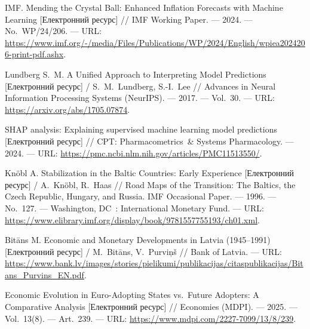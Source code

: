 \documentclass[a4paper,ukrainian,oneside]{extreport}
\begin{document}
\begin{enumerate}[label={[\arabic*]}, leftmargin=0pt, itemindent=0pt, labelindent=0pt]
\item IMF. Mending the Crystal Ball: Enhanced Inflation Forecasts with Machine Learning [Електронний ресурс] // IMF Working Paper. --- 2024. --- No.~WP/24/206. --- URL: \url{https://www.imf.org/-/media/Files/Publications/WP/2024/English/wpiea2024206-print-pdf.ashx}.

\item Lundberg S.~M. A Unified Approach to Interpreting Model Predictions [Електронний ресурс] / S.~M.~Lundberg, S.-I.~Lee // Advances in Neural Information Processing Systems (NeurIPS). --- 2017. --- Vol.~30. --- URL: \url{https://arxiv.org/abs/1705.07874}.

\item SHAP analysis: Explaining supervised machine learning model predictions [Електронний ресурс] // CPT: Pharmacometrics~\& Systems Pharmacology. --- 2024. --- URL: \url{https://pmc.ncbi.nlm.nih.gov/articles/PMC11513550/}.

\item Kn\"obl A. Stabilization in the Baltic Countries: Early Experience [Електронний ресурс] / A.~Kn\"obl, R.~Haas // Road Maps of the Transition: The Baltics, the Czech Republic, Hungary, and Russia. IMF Occasional Paper. --- 1996. --- No.~127. --- Washington, DC~: International Monetary Fund. --- URL: \url{https://www.elibrary.imf.org/display/book/9781557755193/ch01.xml}.

\item Bit\={a}ns M. Economic and Monetary Developments in Latvia (1945--1991) [Електронний ресурс] / M.~Bit\={a}ns, V.~Purvi\c{n}\v{s} // Bank of Latvia. --- URL: \url{https://www.bank.lv/images/stories/pielikumi/publikacijas/citaspublikacijas/Bitans_Purvins_EN.pdf}.

\item Economic Evolution in Euro-Adopting States vs.\ Future Adopters: A Comparative Analysis [Електронний ресурс] // Economies (MDPI). --- 2025. --- Vol.~13(8). --- Art.~239. --- URL: \url{https://www.mdpi.com/2227-7099/13/8/239}.

\end{enumerate}
\end{document}
